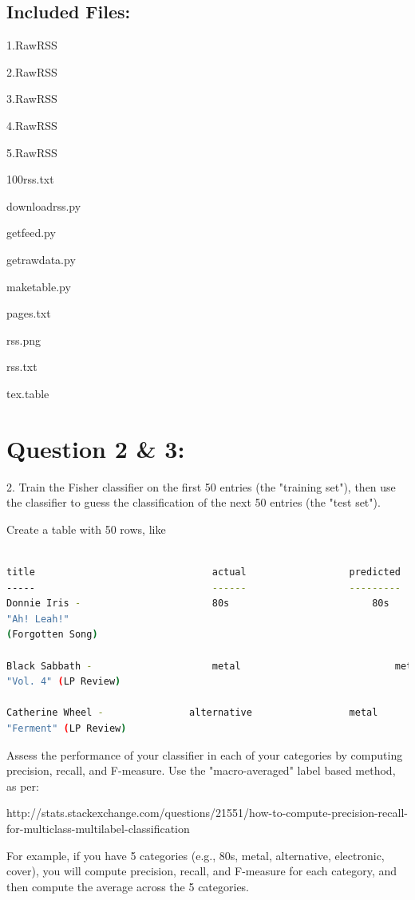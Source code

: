 \documentclass[a4paper, 11pt]{article}
\begin{document}
\subsection*{Included Files:}
1.RawRSS

\noindent
2.RawRSS

\noindent
3.RawRSS

\noindent
4.RawRSS

\noindent
5.RawRSS

\noindent
100rss.txt

\noindent
downloadrss.py

\noindent
getfeed.py

\noindent
getrawdata.py

\noindent
maketable.py

\noindent
pages.txt

\noindent
rss.png

\noindent
rss.txt

\noindent
tex.table

\section*{Question 2 \& 3:}
2. Train the Fisher classifier on the first 50 entries (the "training
set"), then use the classifier to guess the classification of the
next 50 entries (the "test set").

Create a table with 50 rows, like

\begin{lstlisting}[language=bash,label=Command:, breakatwhitespace=〈false), caption=Command:]

title								actual					predicted
-----								------					---------
Donnie Iris - 						80s							80s
"Ah! Leah!" 
(Forgotten Song)	

Black Sabbath - 					metal							metal
"Vol. 4" (LP Review)

Catherine Wheel - 				alternative					metal
"Ferment" (LP Review)

\end{lstlisting}

Assess the performance of your classifier in each of your categories
by computing precision, recall, and F-measure.  Use the "macro-averaged"
label based method, as per:

http://stats.stackexchange.com/questions/21551/how-to-compute-precision-recall-for-multiclass-multilabel-classification

For example, if you have 5 categories (e.g., 80s, metal,
alternative, electronic, cover), you will compute 
precision, recall, and F-measure for each category,
and then compute the average across the 5 categories.
\end{document}
